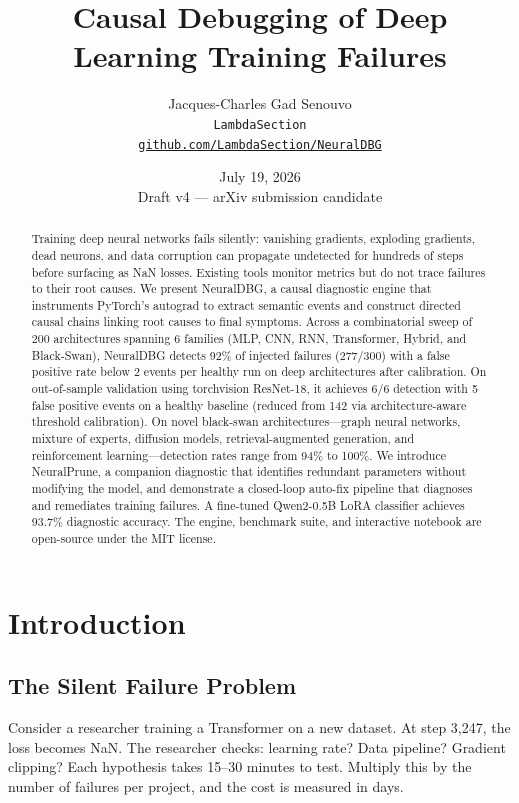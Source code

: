 \documentclass[11pt]{article}
\title{Causal Debugging of Deep Learning Training Failures}
\author{Jacques-Charles Gad Senouvo\\
\texttt{LambdaSection}\\
\texttt{\href{https://github.com/LambdaSection/NeuralDBG}{github.com/LambdaSection/NeuralDBG}}}
\date{July 19, 2026\\Draft v4 — arXiv submission candidate}
\begin{document}
\maketitle

\begin{abstract}
Training deep neural networks fails silently: vanishing gradients, exploding gradients, dead neurons, and data corruption can propagate undetected for hundreds of steps before surfacing as NaN losses. Existing tools monitor metrics but do not trace failures to their root causes. We present NeuralDBG, a causal diagnostic engine that instruments PyTorch's autograd to extract semantic events and construct directed causal chains linking root causes to final symptoms. Across a combinatorial sweep of 200 architectures spanning 6 families (MLP, CNN, RNN, Transformer, Hybrid, and Black-Swan), NeuralDBG detects 92\% of injected failures (277/300) with a false positive rate below 2 events per healthy run on deep architectures after calibration. On out-of-sample validation using torchvision ResNet-18, it achieves 6/6 detection with 5 false positive events on a healthy baseline (reduced from 142 via architecture-aware threshold calibration). On novel black-swan architectures—graph neural networks, mixture of experts, diffusion models, retrieval-augmented generation, and reinforcement learning—detection rates range from 94\% to 100\%. We introduce NeuralPrune, a companion diagnostic that identifies redundant parameters without modifying the model, and demonstrate a closed-loop auto-fix pipeline that diagnoses and remediates training failures. A fine-tuned Qwen2-0.5B LoRA classifier achieves 93.7\% diagnostic accuracy. The engine, benchmark suite, and interactive notebook are open-source under the MIT license.
\end{abstract}

\section{Introduction}

\subsection{The Silent Failure Problem}

Consider a researcher training a Transformer on a new dataset. At step 3,247, the loss becomes NaN. The researcher checks: learning rate? Data pipeline? Gradient clipping? Each hypothesis takes 15--30 minutes to test. Multiply this by the number of failures per project, and the cost is measured in days.
\end{document}
